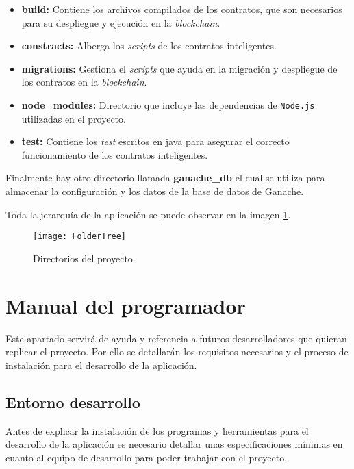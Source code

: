 \begin{itemize}

\item \textbf{build:} Contiene los archivos compilados de los contratos, que son necesarios para su despliegue y ejecución en la \textit{blockchain}.

\item \textbf{constracts:} Alberga los \textit{scripts} de los contratos inteligentes.

\item \textbf{migrations:} Gestiona el \textit{scripts} que ayuda en la migración y despliegue de los contratos en la \textit{blockchain}.

\item \textbf{node\_modules:} Directorio que incluye las dependencias de \texttt{Node.js} utilizadas en el proyecto.

\item \textbf{test:} Contiene los \textit{test} escritos en java para asegurar el correcto funcionamiento de los contratos inteligentes.

\end{itemize}

Finalmente hay otro directorio llamada \textbf{ganache\_db} el cual se utiliza para almacenar la configuración y los datos de la base de datos de Ganache.

Toda la jerarquía de la aplicación se puede observar en la imagen \ref{fig:FolderTree}.

\begin{figure}[h]
	\centering
	\texttt{[image: FolderTree]}
	\caption[Directorios del proyecto]{Directorios del proyecto.}
	\label{fig:FolderTree}
\end{figure}


\section{Manual del programador}

Este apartado servirá de ayuda y referencia a futuros desarrolladores que quieran replicar el proyecto. 
Por ello se detallarán los requisitos necesarios y el proceso de instalación para el desarrollo de la aplicación. 

\subsection{Entorno desarrollo}

Antes de explicar la instalación de los programas y herramientas para el desarrollo de la aplicación es necesario detallar unas especificaciones mínimas en cuanto al equipo de desarrollo para poder trabajar con el proyecto.


